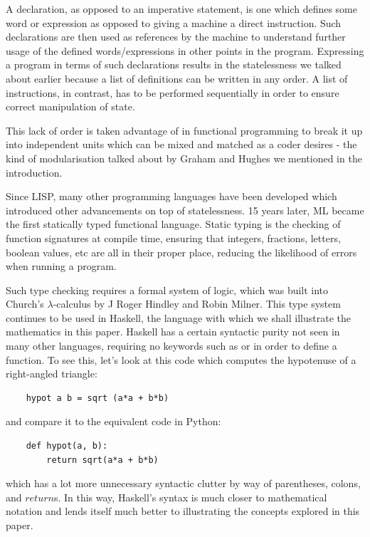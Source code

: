 A declaration, as opposed to an imperative statement, is one which defines some word or expression as opposed to giving a machine a direct instruction. Such declarations are then used as references by the machine to understand further usage of the defined words/expressions in other points in the program. Expressing a program in terms of such declarations results in the statelessness we talked about earlier because a list of definitions can be written in any order. A list of instructions, in contrast, has to be performed sequentially in order to ensure correct manipulation of state.

This lack of order is taken advantage of in functional programming to break it up into independent units which can be mixed and matched as a coder desires - the kind of modularisation talked about by Graham\cite{OnLisp} and Hughes\cite{WhyFunctional} we mentioned in the introduction.

Since LISP, many other programming languages have been developed which introduced other advancements on top of statelessness. 15 years later, ML became the first statically typed functional language. Static typing is the checking of function signatures at compile time, ensuring that integers, fractions, letters, boolean values, etc are all in their proper place, reducing the likelihood of errors when running a program.

Such type checking requires a formal system of logic, which was built into Church's $\lambda$-calculus by J Roger Hindley and Robin Milner. This type system continues to be used in Haskell, the language with which we shall illustrate the mathematics in this paper. Haskell has a certain syntactic purity not seen in many other languages, requiring no keywords such as  or  in order to define a function. To see this, let's look at this code which computes the hypotenuse of a right-angled triangle:
\begin{lstlisting}
    hypot a b = sqrt (a*a + b*b)
\end{lstlisting}
and compare it to the equivalent code in Python:
\begin{lstlisting}
    def hypot(a, b):
        return sqrt(a*a + b*b)
\end{lstlisting}
which has a lot more unnecessary syntactic clutter by way of parentheses, colons, and $return$s. In this way, Haskell's syntax is much closer to mathematical notation and lends itself much better to illustrating the concepts explored in this paper.

